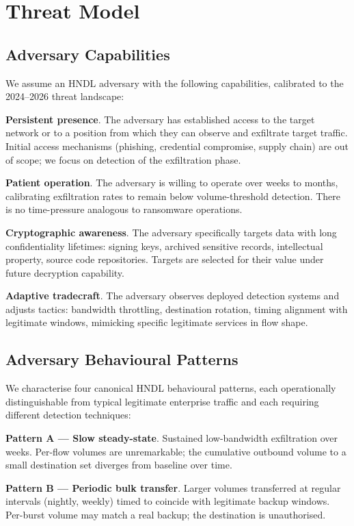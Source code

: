 \documentclass[sigconf,nonacm]{acmart}
\begin{document}
\section{Threat Model}

\subsection{Adversary Capabilities}

We assume an HNDL adversary with the following capabilities, calibrated
to the 2024--2026 threat landscape:

\textbf{Persistent presence}. The adversary has established access to
the target network or to a position from which they can observe and
exfiltrate target traffic. Initial access mechanisms (phishing,
credential compromise, supply chain) are out of scope; we focus on
detection of the exfiltration phase.

\textbf{Patient operation}. The adversary is willing to operate over
weeks to months, calibrating exfiltration rates to remain below
volume-threshold detection. There is no time-pressure analogous to
ransomware operations.

\textbf{Cryptographic awareness}. The adversary specifically targets
data with long confidentiality lifetimes: signing keys, archived
sensitive records, intellectual property, source code repositories.
Targets are selected for their value under future decryption
capability.

\textbf{Adaptive tradecraft}. The adversary observes deployed
detection systems and adjusts tactics: bandwidth throttling,
destination rotation, timing alignment with legitimate windows,
mimicking specific legitimate services in flow shape.

\subsection{Adversary Behavioural Patterns}

We characterise four canonical HNDL behavioural patterns, each
operationally distinguishable from typical legitimate enterprise
traffic and each requiring different detection techniques:

\textbf{Pattern A --- Slow steady-state}. Sustained low-bandwidth
exfiltration over weeks. Per-flow volumes are unremarkable; the
cumulative outbound volume to a small destination set diverges from
baseline over time.

\textbf{Pattern B --- Periodic bulk transfer}. Larger volumes
transferred at regular intervals (nightly, weekly) timed to coincide
with legitimate backup windows. Per-burst volume may match a real
backup; the destination is unauthorised.
\end{document}
